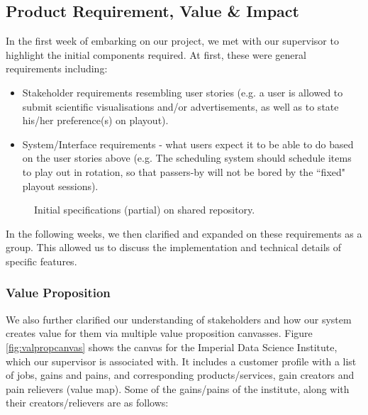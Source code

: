 ﻿\documentclass[a4paper, titlepage]{article}
\begin{document}
\subsection{Product Requirement, Value \& Impact}

In the first week of embarking on our project, we met with our supervisor to highlight the initial components required. At first, these were general
requirements including:

\begin{itemize}

  \item Stakeholder requirements resembling user stories (e.g. a user is allowed to submit scientific visualisations and/or advertisements, as well as to state his/her preference(s) on playout).

  \item System/Interface requirements - what users expect it to be able to do based on the user stories above (e.g. The scheduling system should schedule items to play out in rotation, so that passers-by will not be bored by the ``fixed" playout sessions).

\end{itemize}

\begin{figure}[H]
  \centering
  \caption{Initial specifications (partial) on shared repository.}
  \label{fig:specs}
\end{figure}

In the following weeks, we then clarified and expanded on these requirements as a group. This allowed us to discuss the implementation and technical details of specific features.

\subsubsection{Value Proposition}

We also further clarified our understanding of stakeholders and how our system creates value for them via multiple value proposition canvasses. Figure \ref{fig:valpropcanvas} shows the canvas for the Imperial Data Science Institute, which our supervisor is associated with. It includes a customer profile with a list of jobs, gains and pains, and corresponding products/services, gain creators and pain relievers (value map). Some of the gains/pains of the institute, along with their creators/relievers are as follows:
\end{document}
